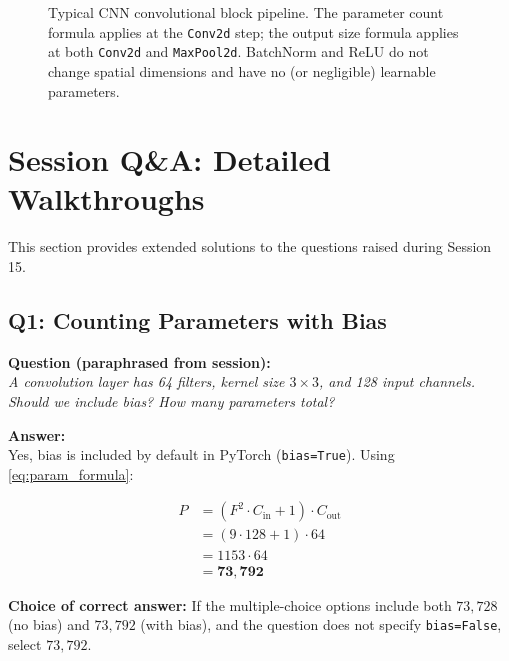 \documentclass[12pt,a4paper]{article}
\newcommand{\Cin}{C_{\mathrm{in}}}
\newcommand{\Cout}{C_{\mathrm{out}}}
\begin{document}
\begin{figure}[ht]
\caption{Typical CNN convolutional block pipeline. The parameter count
  formula applies at the \texttt{Conv2d} step; the output size formula
  applies at both \texttt{Conv2d} and \texttt{MaxPool2d}. BatchNorm and
  ReLU do not change spatial dimensions and have no (or negligible) learnable
  parameters.}
\label{fig:cnn_pipeline}
\end{figure}

\section{Session Q\&A: Detailed Walkthroughs}
\label{sec:qa}

This section provides extended solutions to the questions raised during
Session 15.

\subsection{Q1: Counting Parameters with Bias}

\textbf{Question (paraphrased from session):} \\
\textit{A convolution layer has 64 filters, kernel size $3 \times 3$, and
128 input channels. Should we include bias? How many parameters total?}

\textbf{Answer:} \\
Yes, bias is included by default in PyTorch (\texttt{bias=True}). Using
\cref{eq:param_formula}:

\begin{align*}
  P &= (F^2 \cdot \Cin + 1) \cdot \Cout \\
    &= (9 \cdot 128 + 1) \cdot 64 \\
    &= 1153 \cdot 64 \\
    &= \mathbf{73{,}792}
\end{align*}

\textbf{Choice of correct answer:} If the multiple-choice options include
both $73{,}728$ (no bias) and $73{,}792$ (with bias), and the question does
not specify \texttt{bias=False}, select $73{,}792$.
\end{document}
